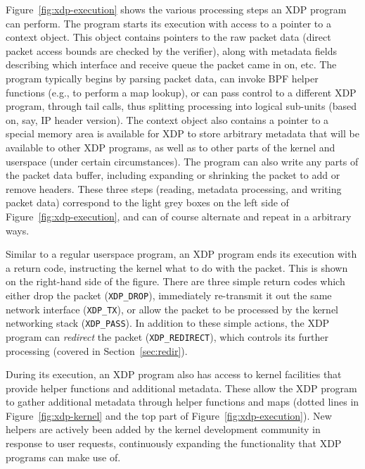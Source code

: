 \documentclass[10pt,sigconf]{acmart}
\begin{document}
Figure~\ref{fig:xdp-execution} shows the various processing steps an XDP program
can perform. The program starts its execution with access to a pointer to a
context object. This object contains pointers to the raw packet data (direct
packet access bounds are checked by the verifier), along with metadata fields
describing which interface and receive queue the packet came in on, etc.
%
The program typically begins by parsing packet data, can invoke
BPF helper functions (e.g., to perform a map lookup), or can pass control to a
different XDP program, through tail calls, thus splitting processing into
logical sub-units (based on, say, IP header version). The context object also
contains a pointer to a special memory area is available for XDP to store
arbitrary metadata that will be available to other XDP programs, as well as to
other parts of the kernel and userspace (under certain circumstances). The
program can also write any parts of the packet data buffer, including expanding
or shrinking the packet to add or remove headers.
%
%
%
These three steps (reading,
metadata processing, and writing packet data) correspond to the light grey boxes
on the left side of Figure~\ref{fig:xdp-execution}, and can of course alternate
and repeat in a arbitrary ways.

Similar to a regular userspace program, an XDP program ends its execution with a
return code, instructing the kernel what to do with the packet. This is shown on
the right-hand side of the figure. There are three simple return codes which
either drop the packet (\texttt{XDP\_DROP}), immediately re-transmit it out the
same network interface (\texttt{XDP\_TX}), or allow the packet to be processed
by the kernel networking stack (\texttt{XDP\_PASS}).  In addition to these
simple actions, the XDP program can \emph{redirect} the packet
(\texttt{XDP\_REDIRECT}), which controls its further processing (covered in
Section~\ref{sec:redir}).

During its execution, an XDP program also has access to kernel facilities that
provide helper functions and additional metadata. These allow the XDP program to
gather additional metadata through helper functions and maps (dotted lines in
Figure~\ref{fig:xdp-kernel} and the top part of Figure~\ref{fig:xdp-execution}).
New helpers are actively been added by the kernel development community in
response to user requests, continuously expanding the functionality that XDP
programs can make use of.
\end{document}
